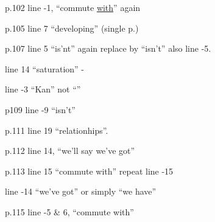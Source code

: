

p.102 line -1, ``commute \uline{with}'' again

p.105 line 7 ``developing'' (single p.)

p.107 line 5 ``is'nt'' again replace by ``isn't'' also  line -5.

line 14 ``saturation'' -

line -3 ``Kan'' not ``''

p109 line -9 ``isn't''

p.111 line 19 ``relationhips''.

p.112 line 14, ``we'll say we've got''

p.113 line 15 ``commute with'' repeat line -15

line -14 ``we've got'' or simply ``we have''

p.115\unsure{:} line -5 \& 6, ``commute with''

